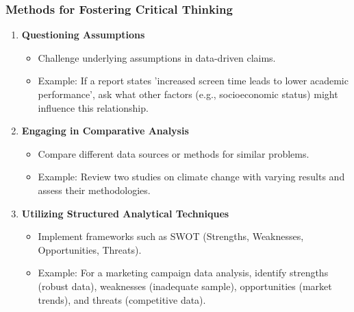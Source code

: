 \documentclass[aspectratio=169]{beamer}
\begin{document}
\begin{frame}[fragile]
    \frametitle{Methods for Fostering Critical Thinking}
    \begin{enumerate}
        \item \textbf{Questioning Assumptions}
        \begin{itemize}
            \item Challenge underlying assumptions in data-driven claims.
            \item Example: If a report states 'increased screen time leads to lower academic performance', ask what other factors (e.g., socioeconomic status) might influence this relationship.
        \end{itemize}
        
        \item \textbf{Engaging in Comparative Analysis}
        \begin{itemize}
            \item Compare different data sources or methods for similar problems.
            \item Example: Review two studies on climate change with varying results and assess their methodologies.
        \end{itemize}
        
        \item \textbf{Utilizing Structured Analytical Techniques}
        \begin{itemize}
            \item Implement frameworks such as SWOT (Strengths, Weaknesses, Opportunities, Threats).
            \item Example: For a marketing campaign data analysis, identify strengths (robust data), weaknesses (inadequate sample), opportunities (market trends), and threats (competitive data).
        \end{itemize}
    \end{enumerate}
\end{frame}
\end{document}
